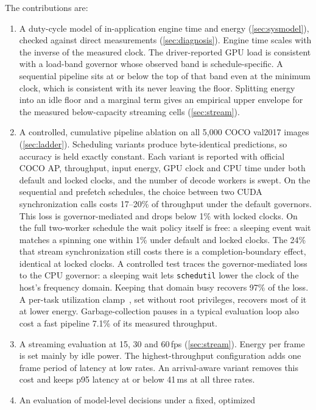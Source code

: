 \noindent The contributions are:
\begin{enumerate}
\item A duty-cycle model of in-application engine time and energy
  (\cref{sec:sysmodel}), checked against direct measurements
  (\cref{sec:diagnosis}). Engine time scales with the inverse of the
  measured clock. The driver-reported GPU load is consistent with a
  load-band governor whose observed band is schedule-specific. A
  sequential pipeline sits at or below the top of that band even at the
  minimum clock, which is consistent with its never leaving the floor.
  Splitting energy into an idle floor and a marginal term gives an
  empirical upper envelope for the measured below-capacity streaming
  cells (\cref{sec:stream}).
\item A controlled, cumulative pipeline ablation on all 5,000 COCO
  val2017 images (\cref{sec:ladder}). Scheduling variants produce
  byte-identical predictions, so accuracy is held exactly constant.
  Each variant is reported with official COCO AP, throughput, input
  energy, GPU clock and CPU time under both default and locked clocks,
  and the number of decode workers is swept. On the sequential and
  prefetch schedules, the choice between two CUDA synchronization calls
  costs 17--20\% of throughput under the default governors. This loss
  is governor-mediated and drops below 1\% with locked clocks. On the
  full two-worker schedule the wait policy itself is free: a sleeping
  event wait matches a spinning one within 1\% under default and locked
  clocks. The 24\% that stream synchronization still costs there is a
  completion-boundary effect, identical at locked clocks. A controlled
  test traces the governor-mediated loss to the CPU governor: a
  sleeping wait lets \texttt{schedutil} lower the clock of the host's
  frequency domain. Keeping that domain busy recovers 97\% of the loss.
  A per-task utilization clamp~\cite{linux2024uclamp}, set without root
  privileges, recovers most of it at lower energy. Garbage-collection
  pauses in a typical evaluation loop also cost a fast pipeline 7.1\%
  of its measured throughput.
\item A streaming evaluation at 15, 30 and 60\,fps (\cref{sec:stream}).
  Energy per frame is set mainly by idle power. The highest-throughput
  configuration adds one frame period of latency at low rates. An
  arrival-aware variant removes this cost and keeps p95 latency at or
  below 41\,ms at all three rates.
\item An evaluation of model-level decisions under a fixed, optimized

\end{enumerate}
